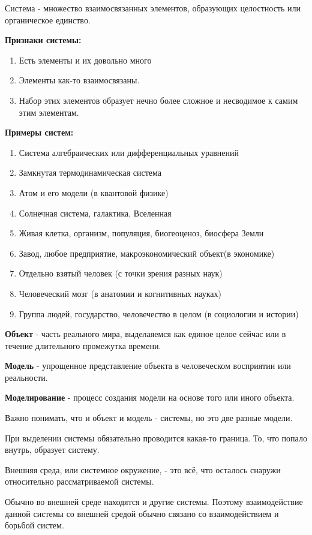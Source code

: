 \documentclass[a4paper]{article}
\begin{document}
	Система - множество взаимосвязанных элементов, образующих целостность или органическое единство.
	
	\textbf{Признаки системы:}
		\begin{enumerate}
		\item Есть элементы и их довольно много
		\item Элементы как-то взаимосвязаны.
		\item Набор этих элементов образует нечно более сложное и несводимое к самим этим элементам.
	\end{enumerate}

	\textbf{Примеры систем:}
		\begin{enumerate}
		\item Система алгебраических или дифференциальных уравнений
		\item Замкнутая термодинамическая система
		\item Атом и его модели (в квантовой физике)
		\item Солнечная система, галактика, Вселенная
		\item Живая клетка, организм, популяция, биогеоценоз, биосфера Земли
		\item Завод, любое предприятие, макроэкономический объект(в экономике)
		\item Отдельно взятый человек (с точки зрения разных наук)
		\item Человеческий мозг (в анатомии и когнитивных науках)
		\item Группа людей, государство, человечество в целом (в социологии и истории)
	\end{enumerate}


	\textbf{Объект} - часть реального мира, выделаяемся как единое целое сейчас или в течение длительного промежутка времени.
	
	\textbf{Модель} - упрощенное представление объекта в человеческом восприятии или реальности.
	
	\textbf{Моделирование} - процесс создания модели на основе того или иного объекта.
	
	Важно понимать, что и объект и модель - системы, но это две разные модели. 
	
	При выделении системы обязательно проводится какая-то граница. То, что попало внутрь, образует систему.
	
	Внешняя среда, или системное окружение, - это всё, что осталось снаружи относительно рассматриваемой системы.
	
	Обычно во внешней среде находятся и другие системы. Поэтому взаимодействие данной системы со внешней средой обычно связано со взаимодействием и борьбой систем.
	
\end{document}
